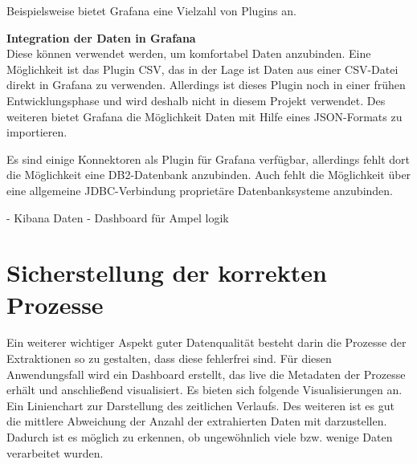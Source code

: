 Beispielsweise bietet Grafana eine Vielzahl von Plugins an.

\textbf{Integration der Daten in Grafana} \\
Diese können verwendet werden, um komfortabel Daten anzubinden.
Eine Möglichkeit ist das Plugin CSV, das in der Lage ist Daten aus einer CSV-Datei direkt in Grafana zu verwenden. 
Allerdings ist dieses Plugin noch in einer frühen Entwicklungsphase und wird deshalb nicht in diesem Projekt verwendet. \cite{https://grafana.com/grafana/plugins/marcusolsson-csv-datasource?pg=plugins&plcmt=featured-undefined}
Des weiteren bietet Grafana die Möglichkeit Daten mit Hilfe eines JSON-Formats zu importieren. 

Es sind einige Konnektoren als Plugin für Grafana verfügbar, allerdings fehlt dort die Möglichkeit eine DB2-Datenbank anzubinden. \cite{https://grafana.com/grafana/plugins?type=datasource}
Auch fehlt die Möglichkeit über eine allgemeine JDBC-Verbindung proprietäre Datenbanksysteme anzubinden.





- Kibana Daten
- Dashboard für Ampel logik

\section{Sicherstellung der korrekten Prozesse}
Ein weiterer wichtiger Aspekt guter Datenqualität besteht darin die Prozesse der Extraktionen so zu gestalten, dass diese fehlerfrei sind.
Für diesen Anwendungsfall wird ein Dashboard erstellt, das live die Metadaten der Prozesse erhält und anschließend visualisiert.
Es bieten sich folgende Visualisierungen an.
Ein Linienchart zur Darstellung des zeitlichen Verlaufs.
Des weiteren ist es gut die mittlere Abweichung der Anzahl der extrahierten Daten mit darzustellen. 
Dadurch ist es möglich zu erkennen, ob ungewöhnlich viele bzw. wenige Daten verarbeitet wurden. 


